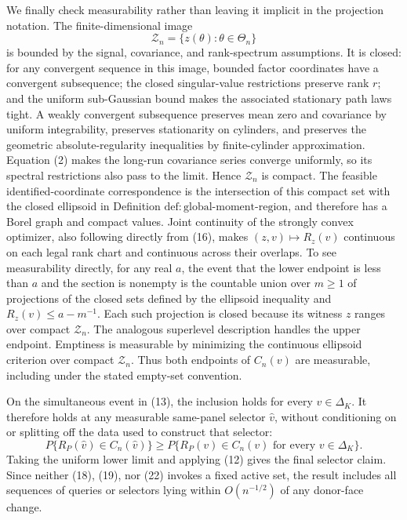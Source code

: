 We finally check measurability rather than leaving it implicit in the projection notation.  The finite-dimensional image
\[
\mathcal Z_n=\{z(\theta):\theta\in\Theta_n\}
\]
is bounded by the signal, covariance, and rank-spectrum assumptions.  It is closed: for any convergent sequence in this image, bounded factor coordinates have a convergent subsequence; the closed singular-value restrictions preserve rank \(r\); and the uniform sub-Gaussian bound makes the associated stationary path laws tight.  A weakly convergent subsequence preserves mean zero and covariance by uniform integrability, preserves stationarity on cylinders, and preserves the geometric absolute-regularity inequalities by finite-cylinder approximation.  Equation (2) makes the long-run covariance series converge uniformly, so its spectral restrictions also pass to the limit.  Hence \(\mathcal Z_n\) is compact.  The feasible identified-coordinate correspondence is the intersection of this compact set with the closed ellipsoid in Definition \(\mathrm{def:global\mbox{-}moment\mbox{-}region}\), and therefore has a Borel graph and compact values.  Joint continuity of the strongly convex optimizer, also following directly from (16), makes \((z,v)\mapsto R_z(v)\) continuous on each legal rank chart and continuous across their overlaps.  To see measurability directly, for any real \(a\), the event that the lower endpoint is less than \(a\) and the section is nonempty is the countable union over \(m\geq1\) of projections of the closed sets defined by the ellipsoid inequality and \(R_z(v)\leq a-m^{-1}\).  Each such projection is closed because its witness \(z\) ranges over compact \(\mathcal Z_n\).  The analogous superlevel description handles the upper endpoint.  Emptiness is measurable by minimizing the continuous ellipsoid criterion over compact \(\mathcal Z_n\).  Thus both endpoints of \(C_n(v)\) are measurable, including under the stated empty-set convention.

On the simultaneous event in (13), the inclusion holds for every \(v\in\Delta_K\).  It therefore holds at any measurable same-panel selector \(\widehat v\), without conditioning on or splitting off the data used to construct that selector:
\[
P\{R_P(\widehat v)\in C_n(\widehat v)\}
\geq
P\{R_P(v)\in C_n(v)\text{ for every }v\in\Delta_K\}.
\]
Taking the uniform lower limit and applying (12) gives the final selector claim.  Since neither (18), (19), nor (22) invokes a fixed active set, the result includes all sequences of queries or selectors lying within \(O(n^{-1/2})\) of any donor-face change.
